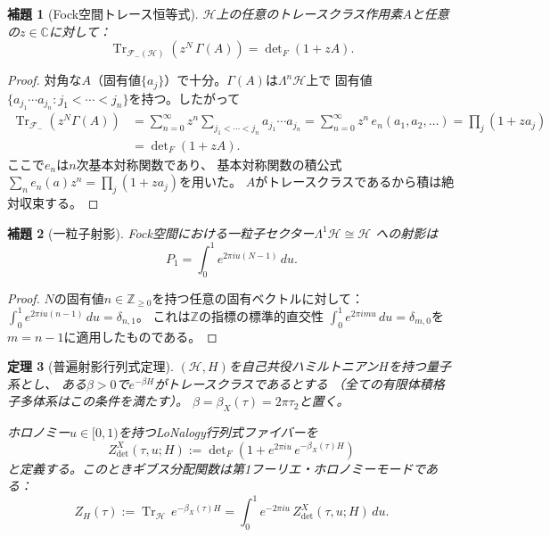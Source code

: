 \documentclass[12pt]{article}
\theoremstyle{plain}
\newtheorem{theorem}{定理}[section]
\newtheorem{lemma}[theorem]{補題}
\theoremstyle{definition}
\numberwithin{equation}{section}
\newcommand{\C}{\mathbb{C}}
\newcommand{\Z}{\mathbb{Z}}
\DeclareMathOperator{\Tr}{Tr}
\begin{document}
\begin{lemma}[Fock空間トレース恒等式]\label{lem:focktrace}
$\mathcal{H}$上の任意のトレースクラス作用素$A$と任意の$z\in\C$に対して：
\begin{equation}\label{eq:focktrace}
\Tr_{\mathcal{F}_-(\mathcal{H})}\!\left(z^N\,\Gamma(A)\right)
= \det\nolimits_F(1+zA).
\end{equation}
\end{lemma}

\begin{proof}
対角な$A$（固有値$\{a_j\}$）で十分。$\Gamma(A)$は$\Lambda^n\mathcal{H}$上で
固有値$\{a_{j_1}\cdots a_{j_n}:j_1<\cdots<j_n\}$を持つ。したがって
\begin{align}
\Tr_{\mathcal{F}_-}(z^N\Gamma(A))
&= \sum_{n=0}^{\infty}z^n\sum_{j_1<\cdots<j_n}a_{j_1}\cdots a_{j_n}
= \sum_{n=0}^{\infty}z^n\,e_n(a_1,a_2,\ldots)
= \prod_j(1+za_j)\\
&= \det\nolimits_F(1+zA).
\end{align}
ここで$e_n$は$n$次基本対称関数であり、
基本対称関数の積公式$\sum_n e_n(a)z^n=\prod_j(1+za_j)$を用いた。
$A$がトレースクラスであるから積は絶対収束する。
\end{proof}

\begin{lemma}[一粒子射影]\label{lem:projector}
Fock空間における一粒子セクター$\Lambda^1\mathcal{H}\cong\mathcal{H}$
への射影は
\begin{equation}\label{eq:projector}
P_1 = \int_0^1 e^{2\pi iu(N-1)}\,du.
\end{equation}
\end{lemma}

\begin{proof}
$N$の固有値$n\in\Z_{\geq 0}$を持つ任意の固有ベクトルに対して：
$\int_0^1 e^{2\pi iu(n-1)}\,du = \delta_{n,1}$。
これは$\Z$の指標の標準的直交性
$\int_0^1 e^{2\pi imu}\,du=\delta_{m,0}$を$m=n-1$に適用したものである。
\end{proof}

\begin{theorem}[普遍射影行列式定理]\label{thm:universal}
$(\mathcal{H},H)$を自己共役ハミルトニアン$H$を持つ量子系とし、
ある$\beta>0$で$e^{-\beta H}$がトレースクラスであるとする
（全ての有限体積格子多体系はこの条件を満たす）。
$\beta=\beta_X(\tau)=2\pi\tau_2$と置く。

ホロノミー$u\in[0,1)$を持つLoNalogy行列式ファイバーを
\begin{equation}\label{eq:detbundle}
Z_{\det}^X(\tau,u;H)
:= \det\nolimits_F\!\left(1+e^{2\pi iu}\,e^{-\beta_X(\tau)H}\right)
\end{equation}
と定義する。このときギブス分配関数は第1フーリエ・ホロノミーモードである：
\begin{equation}\label{eq:universalthm}
\boxed{Z_H(\tau)
:= \Tr_{\mathcal{H}}\,e^{-\beta_X(\tau)H}
= \int_0^1 e^{-2\pi iu}\,Z_{\det}^X(\tau,u;H)\,du.}
\end{equation}
\end{theorem}
\end{document}
